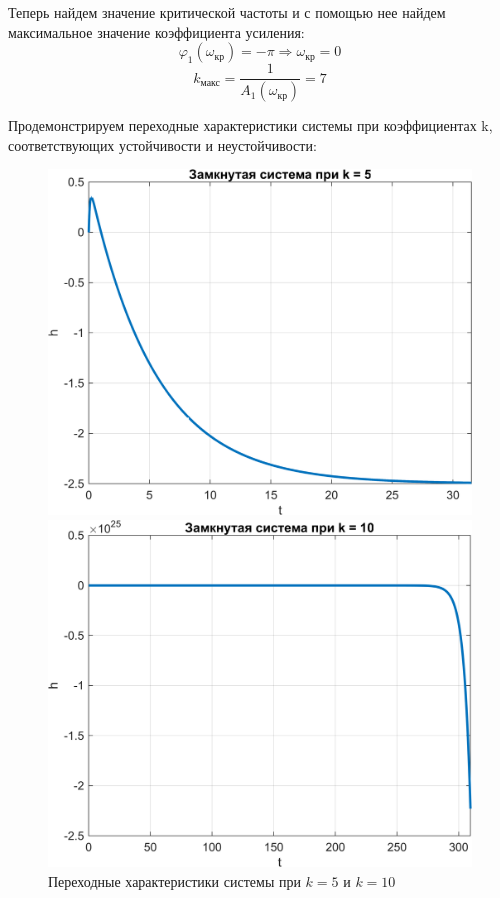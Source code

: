 Теперь найдем значение критической частоты и с помощью нее найдем максимальное значение коэффициента усиления:
\[
\varphi_1(\omega_{\text{кр}}) = -\pi \Rightarrow \omega_{\text{кр}} = 0
\]
\[
k_{\text{макс}} = \frac{1}{A_1(\omega_{\text{кр}})} = 7
\]

Продемонстрируем переходные характеристики системы при коэффициентах k, соответствующих устойчивости и неустойчивости:
\begin{figure}[H]
    \centering
    \begin{minipage}{0.45\textwidth}
        \centering
        \includegraphics[width=1\textwidth, trim={0cm 0cm 0cm 0cm}]{../images/2_1_1_cl.png}
    \end{minipage}
    \hfill
    \begin{minipage}{0.45\textwidth}
        \centering
        \includegraphics[width=1\textwidth, trim={0cm 0cm 0cm 0cm}]{../images/2_1_2_cl.png}
    \end{minipage}
    \caption{Переходные характеристики системы при $k = 5$ и $k = 10$}
\end{figure}

